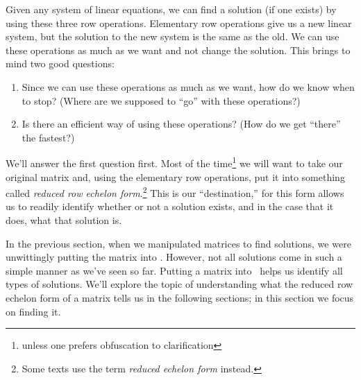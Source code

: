 
Given any system of linear equations, we can find a solution (if one exists) by using these three row operations. Elementary row operations give us a new linear system, but the solution to the new system is the same as the old. We can use these operations as much as we want and not change the solution. This brings to mind two good questions:
\begin{enumerate}
\item		Since we can use these operations as much as we want, how do we know when to stop? (Where are we supposed to ``go'' with these operations?)
\item		Is there an efficient way of using these operations? (How do we get ``there'' the fastest?)
\end{enumerate}

We'll answer the first question first. Most of the time\footnote{unless one prefers obfuscation to clarification} we will want to take our original matrix and, using the elementary row operations, put it into something called \textit{reduced row echelon form}.\footnote{Some texts use the term \textit{reduced echelon form} instead.} This is our ``destination,'' for this form allows us to readily identify whether or not a solution exists, and in the case that it does, what that solution is. 

In the previous section, when we manipulated matrices to find solutions, we were unwittingly putting the matrix into \rref. However, not all solutions come in such a simple manner as we've seen so far. Putting a matrix into \rref\ helps us identify all types of solutions. We'll explore the topic of understanding what the reduced row echelon form of a matrix tells us in the following sections; in this section we focus on finding it.

